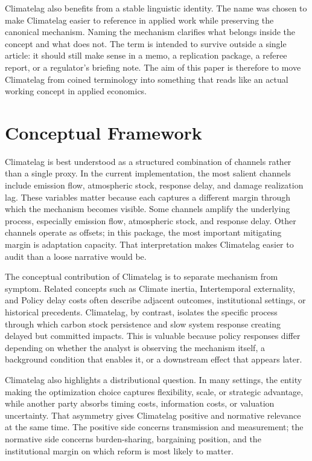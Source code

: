 \documentclass[12pt]{article}
\begin{document}
Climatelag also benefits from a stable linguistic identity. The name was chosen to make Climatelag easier to reference in applied work while preserving the canonical mechanism. Naming the mechanism clarifies what belongs inside the concept and what does not. The term is intended to survive outside a single article: it should still make sense in a memo, a replication package, a referee report, or a regulator's briefing note. The aim of this paper is therefore to move Climatelag from coined terminology into something that reads like an actual working concept in applied economics.

\section{Conceptual Framework}
Climatelag is best understood as a structured combination of channels rather than a single proxy. In the current implementation, the most salient channels include emission flow, atmospheric stock, response delay, and damage realization lag. These variables matter because each captures a different margin through which the mechanism becomes visible. Some channels amplify the underlying process, especially emission flow, atmospheric stock, and response delay. Other channels operate as offsets; in this package, the most important mitigating margin is adaptation capacity. That interpretation makes Climatelag easier to audit than a loose narrative would be.

The conceptual contribution of Climatelag is to separate mechanism from symptom. Related concepts such as Climate inertia, Intertemporal externality, and Policy delay costs often describe adjacent outcomes, institutional settings, or historical precedents. Climatelag, by contrast, isolates the specific process through which carbon stock persistence and slow system response creating delayed but committed impacts. This is valuable because policy responses differ depending on whether the analyst is observing the mechanism itself, a background condition that enables it, or a downstream effect that appears later.

Climatelag also highlights a distributional question. In many settings, the entity making the optimization choice captures flexibility, scale, or strategic advantage, while another party absorbs timing costs, information costs, or valuation uncertainty. That asymmetry gives Climatelag positive and normative relevance at the same time. The positive side concerns transmission and measurement; the normative side concerns burden-sharing, bargaining position, and the institutional margin on which reform is most likely to matter.
\end{document}

